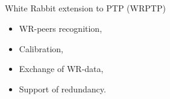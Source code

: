 \documentclass[compress,red]{beamer}
\begin{document}
\subsection{}
\begin{frame}{White Rabbit extension to PTP (WRPTP)}

  \begin{itemize}
    \item WR-peers recognition,
    \item Calibration,
    \item Exchange of WR-data,
    \item Support of redundancy.
  \end{itemize}

\end{frame}
% 
\end{document}
